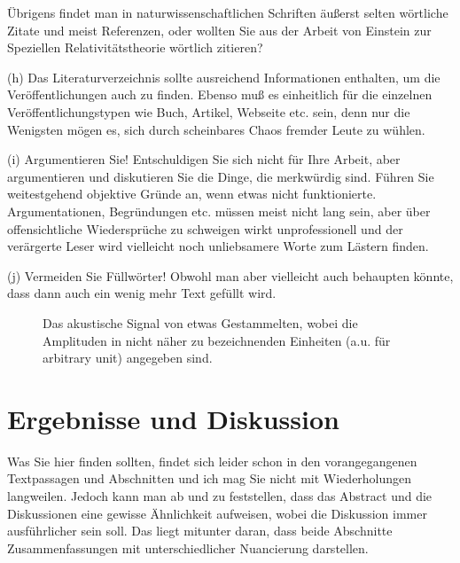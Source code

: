 \documentclass[10pt,twocolumn]{scrartcl}
\begin{document}
\begin{list}{-}{}
Übrigens findet man in naturwissenschaftlichen Schriften 
äußerst selten wörtliche Zitate und meist Referenzen, oder wollten Sie
aus der Arbeit von Einstein zur Speziellen Relativitätstheorie \cite{Einstein1905}
wörtlich zitieren?

\item[(h)] Das Literaturverzeichnis sollte ausreichend Informationen enthalten,
um die Veröffentlichungen auch zu finden. Ebenso muß es einheitlich für
die einzelnen Veröffentlichungstypen wie Buch, Artikel, Webseite etc. sein,
denn nur die Wenigsten mögen es, sich durch scheinbares Chaos fremder Leute zu wühlen.

\item[(i)] Argumentieren Sie! Entschuldigen Sie sich nicht für Ihre Arbeit, 
aber argumentieren und diskutieren Sie die Dinge, die merkwürdig sind.
Führen Sie weitestgehend objektive Gründe an, wenn etwas nicht funktionierte.
Argumentationen, Begründungen etc. müssen meist nicht lang sein, 
aber über offensichtliche Wiedersprüche zu schweigen wirkt unprofessionell 
und der verärgerte Leser wird vielleicht noch unliebsamere Worte 
zum Lästern finden.

\item[(j)] Vermeiden Sie Füllwörter! Obwohl man aber vielleicht auch behaupten
könnte, dass dann auch ein wenig mehr Text gefüllt wird.
\end{list}

\begin{figure}[t]
\centering
\caption{Das akustische Signal von etwas Gestammelten, wobei die Amplituden in 
nicht näher zu bezeichnenden Einheiten (a.u. für arbitrary unit) angegeben sind.}
\label{fig:audio}
\end{figure}

\section{Ergebnisse und Diskussion}

Was Sie hier finden sollten, findet sich leider schon in den vorangegangenen
Textpassagen und Abschnitten und ich mag Sie nicht mit Wiederholungen
langweilen. Jedoch kann man ab und zu feststellen, dass das Abstract und
die Diskussionen eine gewisse Ähnlichkeit aufweisen, wobei die Diskussion
immer ausführlicher sein soll. Das liegt mitunter daran, dass beide 
Abschnitte Zusammenfassungen mit unterschiedlicher Nuancierung darstellen. 
\end{document}
